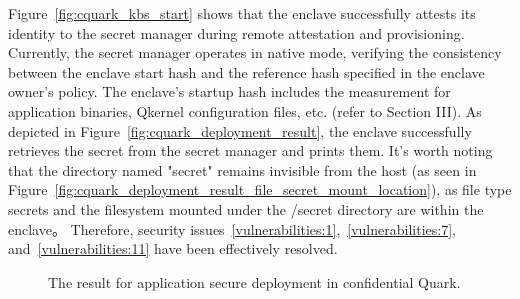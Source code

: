 Figure~\ref{fig:cquark_kbs_start} shows that the enclave successfully attests its identity to the secret manager during remote attestation and provisioning. Currently, the secret manager operates in native mode, verifying the consistency between the enclave start hash and the reference hash specified in the 
enclave owner's policy. The enclave's startup hash includes the measurement for application binaries, Qkernel configuration files, etc. (refer to Section III). As depicted in Figure~\ref{fig:cquark_deployment_result}, the enclave successfully retrieves the secret from the secret manager and prints them. It's worth 
noting that the directory named "secret" remains invisible from the host (as seen in Figure~\ref{fig:cquark_deployment_result_file_secret_mount_location}), as file type secrets and the filesystem mounted under the /secret directory are within the enclave。 Therefore, security issues~\ref{vulnerabilities:1},~\ref{vulnerabilities:7}, and~\ref{vulnerabilities:11} 
have been effectively resolved.


\begin{figure}[!htb]

    
    
    \caption[The result for application secure deployment in confidential Quark]{The result for application secure deployment in confidential Quark.\label{fig:cquark_deployment}}
\end{figure}





